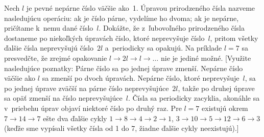 {\D
Nech $l$ je pevné nepárne číslo väčšie ako~1.
Úpravou prirodzeného čísla nazveme nasledujúcu operáciu:
ak je číslo párne, vydelíme ho dvoma; ak je nepárne, pričítame
k~nemu dané číslo~$l$. Dokážte, že z~ľubovoľného prirodzeného čísla
dostaneme po niekoľkých úpravách číslo, ktoré neprevyšuje číslo~$l$,
pritom všetky ďalšie čísla neprevyšujú číslo~$2l$ a~periodicky sa
opakujú. Na príklade $l=7$ sa presvedčte, že zrejmé opakovanie
$l\to 2l\to l\to\dots$ nie je jediné možné. [Využite
nasledujúce poznatky: Párne číslo sa po jednej úprave
zmenší. Nepárne číslo väčšie ako $l$ sa zmenší po dvoch úpravách.
Nepárne číslo, ktoré neprevyšuje~$l$, sa po jednej úprave zväčší
na párne číslo neprevyšujúce~$2l$, takže po druhej úprave sa opäť zmenší na
číslo neprevyšujúce~$l$. Čísla sa periodicky zacyklia,
akonáhle sa v~priebehu úprav objaví niektoré číslo po druhý raz. Pre
$l=7$ existujú okrem $7\to14\to7$ ešte dva ďalšie cykly
$1\to8\to4\to2\to1$, $3\to10\to5\to12\to6\to3$
(keďže sme vypísali všetky čísla od 1 do 7, žiadne ďalšie cykly
neexistujú).]
}

